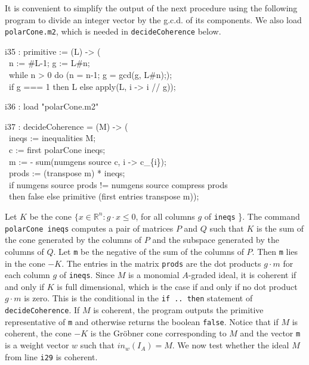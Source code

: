 It is convenient to simplify the output of the next procedure 
using the following program to divide an integer vector 
by the g.c.d. of its components. We also load {\tt polarCone.m2},
which is needed in {\tt decideCoherence} below.

\beginOutput
i35 : primitive := (L) -> (\\
\           n := #L-1; g := L#n;\\
\           while n > 0 do (n = n-1; g = gcd(g, L#n););\\
\           if g === 1 then L else apply(L, i -> i // g));\\
\endOutput

\beginOutput
i36 : load "polarCone.m2" \\
\endOutput

\beginOutput
i37 : decideCoherence = (M) -> (\\
\           ineqs := inequalities M;\\
\           c := first polarCone ineqs;\\
\           m := - sum(numgens source c, i -> c_\{i\});\\
\           prods := (transpose m) * ineqs;\\
\           if numgens source prods != numgens source compress prods\\
\           then false else primitive (first entries transpose m)); \\
\endOutput
 
Let $K$ be the cone $\{x \in {\mathbb R}^n : g \cdot x \leq 0$,
for all columns $g$ of {\tt ineqs} \}. The command {\tt
polarCone ineqs} computes a pair of matrices $P$ and $Q$ such
that $K$ is the sum of the cone generated by the columns of $P$
and the subspace generated by the columns of $Q$. Let {\tt m} be
the negative of the sum of the columns of $P$. Then {\tt m} lies
in the cone $-K$. The entries in the matrix {\tt prods} are the
dot products $g \cdot m$ for each column $g$ of {\tt ineqs}.
Since $M$ is a monomial $A$-graded ideal, it is coherent if and
only if $K$ is full dimensional, which is the case if and only if
no dot product $g \cdot m$ is zero. This is the conditional in
the {\tt if .. then} statement of {\tt decideCoherence}. If $M$
is coherent, the program outputs the primitive representative of
{\tt m} and otherwise returns the boolean {\tt false}. Notice that 
if $M$ is coherent, the cone $-K$ is the Gr\"obner cone corresponding 
to $M$ and the vector {\tt m} is a weight vector $w$ such that
$in_w(I_A) = M$. We now test whether the ideal $M$ from 
line {\tt i29} is coherent.

